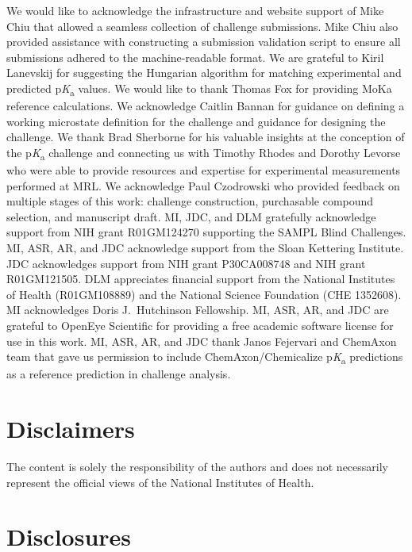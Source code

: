 \documentclass[9pt,lineno,final]{elife}
\newcommand{\pKa}{p\textit{K}\textsubscript{a}}
\begin{document}
We would like to acknowledge the infrastructure and website support of Mike Chiu that allowed a seamless collection of challenge submissions. Mike Chiu also provided assistance with constructing a submission validation script to ensure all submissions adhered to the machine-readable format. 
We are grateful to Kiril Lanevskij for suggesting the Hungarian algorithm for matching experimental and predicted \pKa{} values. 
We would like to thank Thomas Fox for providing MoKa reference calculations.
We acknowledge Caitlin Bannan for guidance on defining a working microstate definition for the challenge and guidance for designing the challenge. 
We thank Brad Sherborne for his valuable insights at the conception of the \pKa{} challenge and connecting us with Timothy Rhodes and Dorothy Levorse who were able to provide resources and expertise for experimental measurements performed at MRL. 
We acknowledge Paul Czodrowski who provided feedback on multiple stages of this work: challenge construction, purchasable compound selection, and manuscript draft. 
MI, JDC, and DLM gratefully acknowledge support from NIH grant R01GM124270 supporting the SAMPL Blind Challenges.
MI, ASR, AR, and JDC acknowledge support from the Sloan Kettering Institute.
JDC acknowledges support from NIH grant P30CA008748 and NIH grant R01GM121505. 
DLM appreciates financial support from the National Institutes of Health (R01GM108889) and the National Science Foundation (CHE 1352608).
MI acknowledges Doris J.\ Hutchinson Fellowship. 
MI, ASR, AR, and JDC are grateful to OpenEye Scientific for providing a free academic software license for use in this work.
MI, ASR, AR, and JDC thank Janos Fejervari and ChemAxon team that gave us permission to include ChemAxon/Chemicalize \pKa{} predictions as a reference prediction in challenge analysis. 


\section{Disclaimers}

The content is solely the responsibility of the authors and does not necessarily represent the official views of the National Institutes of Health.

\section{Disclosures}
\end{document}
